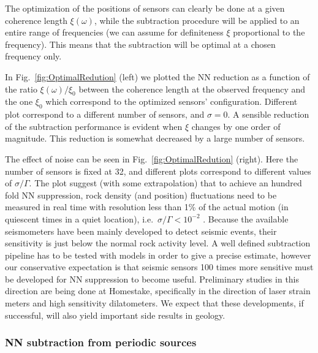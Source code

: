 The optimization of the positions of sensors can clearly be done at a given coherence length $\xi(\omega)$, while the subtraction procedure will be applied to an entire range of frequencies (we can assume for definiteness $\xi$ proportional to the frequency). This means that the subtraction will be optimal at a chosen frequency only. 

In Fig.~\ref{fig:OptimalRedution} (left) we plotted the NN reduction as a function of the ratio $\xi(\omega)/\xi_{0}$ between the coherence length at the observed frequency and the one $\xi_{0}$ which correspond to the optimized sensors' configuration. Different plot correspond to a different number of sensors, and $\sigma=0$. A sensible reduction of the subtraction performance is evident when $\xi$ changes by one order of magnitude. This reduction is somewhat decreased by a large number of sensors. 

The effect of noise can be seen in Fig.~\ref{fig:OptimalRedution} (right). Here the number of sensors is fixed at 32, and different plots correspond to different values of $\sigma/\Gamma$. The plot suggest (with some extrapolation) that to achieve an hundred fold NN suppression, rock density (and position) fluctuations need to be measured in real time with resolution less than 1\% of the actual motion (in quiescent times in a quiet location), i.e.\ $\sigma/\Gamma < 10^{-2}$ . Because the available seismometers have been mainly developed to detect seismic events, their sensitivity is just below the normal rock activity level. A well defined subtraction pipeline has to be tested with models in order to give a precise estimate, however our conservative expectation is that seismic sensors 100 times more sensitive must be developed for NN suppression to become useful. Preliminary studies in this direction are being done at Homestake, specifically in the direction of laser strain meters and high sensitivity dilatometers. We expect that these developments, if successful, will also yield important side results in geology.
\FloatBarrier
\subsubsection{NN subtraction from periodic sources}
\label{subsub:NNsubtractionperiodic}

